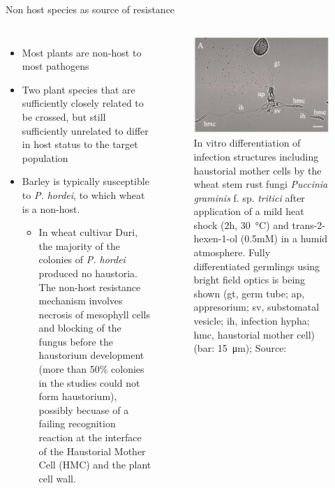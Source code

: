 \documentclass[11pt,dvipsnames,ignorenonframetext,aspectratio=169]{beamer}
\providecommand{\tightlist}{%
  \setlength{\itemsep}{0pt}\setlength{\parskip}{0pt}}
\newcommand{\bcolumns}{\begin{columns}[T, onlytextwidth]}
\newcommand{\ecolumns}{\end{columns}}
\begin{document}
\begin{frame}{Non host species as source of resistance}
\protect\hypertarget{non-host-species-as-source-of-resistance}{}
\bcolumns
{}
\small

\begin{itemize}
\tightlist
\item
  Most plants are non-host to most pathogens
\item
  Two plant species that are sufficiently closely related to be crossed,
  but still sufficiently unrelated to differ in host status to the
  target population
\item
  Barley is typically susceptible to \emph{P. hordei}, to which wheat is
  a non-host.

  \begin{itemize}
  \tightlist
  \item
    In wheat cultivar Duri, the majority of the colonies of \emph{P.
    hordei} produced no haustoria. The non-host resistance mechanism
    involves necrosis of mesophyll cells and blocking of the fungus
    before the haustorium development (more than 50\% colonies in the
    studies could not form haustorium), possibly becuase of a failing
    recognition reaction at the interface of the Haustorial Mother Cell
    (HMC) and the plant cell wall.
  \end{itemize}
\end{itemize}


\begin{figure}
\includegraphics[width=0.98\linewidth]{../images/haustorial_mother_cell} \caption{In vitro differentiation of infection structures including haustorial mother cells by the wheat stem rust fungi \textit{Puccinia graminis} f. sp. \textit{tritici} after application of a mild heat shock (2h, \SI{30}{\celsius}) and trans-2-hexen-1-ol (0.5mM) in a humid atmosphere. Fully differentiated germlings using bright field optics is being shown (gt, germ tube; ap, appresorium; sv, substomatal vesicle; ih, infection hypha; hmc, haustorial mother cell) (bar: \SI{15}{\micro\meter}); Source: \cite{wietholter2003vitro}}\label{fig:haustorial-mother-cell}
\end{figure}

\ecolumns
\end{frame}
\end{document}
